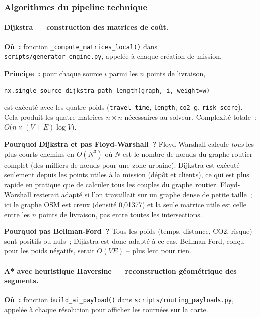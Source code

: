 \documentclass[a4paper, 12pt, twoside]{article}
\begin{document}
\subsubsection{Algorithmes du pipeline technique}

\paragraph{Dijkstra --- construction des matrices de co\^{u}t.}

\textbf{O\`{u}~:} fonction \texttt{\_compute\_matrices\_local()} dans \texttt{scripts/generator\_engine.py},
appel\'{e}e \`{a} chaque cr\'{e}ation de mission.

\textbf{Principe~:} pour chaque source $i$ parmi les $n$ points de livraison,
\begin{lstlisting}[language=Python]
nx.single_source_dijkstra_path_length(graph, i, weight=w)
\end{lstlisting}
est ex\'{e}cut\'{e} avec les quatre poids (\texttt{travel\_time}, \texttt{length},
\texttt{co2\_g}, \texttt{risk\_score}).
Cela produit les quatre matrices $n \times n$ n\'{e}cessaires au solveur.
Complexit\'{e} totale~: $O\bigl(n \times (V + E) \log V\bigr)$.

\textbf{Pourquoi Dijkstra et pas Floyd-Warshall~?}
Floyd-Warshall calcule \emph{tous} les plus courts chemins en $O(N^3)$ o\`{u} $N$ est
le nombre de n\oe uds du graphe routier complet (des milliers de n\oe uds pour une zone
urbaine). Dijkstra est ex\'{e}cut\'{e} seulement depuis les points utiles \`{a} la mission
(d\'{e}p\^{o}t et clients), ce qui est plus rapide en pratique que de calculer tous les couples
du graphe routier. Floyd-Warshall resterait adapt\'{e}
si l'on travaillait sur un graphe dense de petite taille~; ici le graphe OSM est creux
(densit\'{e} 0,01377) et la seule matrice utile est celle entre les $n$ points de livraison,
pas entre toutes les intersections.

\textbf{Pourquoi pas Bellman-Ford~?}
Tous les poids (temps, distance, CO2, risque) sont positifs ou nuls~; Dijkstra est donc
adapt\'{e} \`{a} ce cas. Bellman-Ford, conçu pour les poids n\'{e}gatifs, serait
$O(VE)$ -- plus lent pour rien.

\paragraph{A* avec heuristique Haversine --- reconstruction g\'{e}om\'{e}trique des segments.}

\textbf{O\`{u}~:} fonction \texttt{build\_ai\_payload()} dans \texttt{scripts/routing\_payloads.py},
appel\'{e}e \`{a} chaque r\'{e}solution pour afficher les tourn\'{e}es sur la carte.
\end{document}
